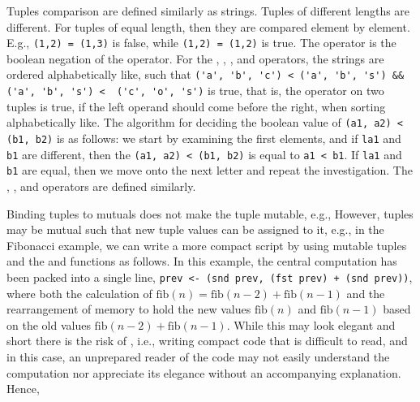 Tuples comparison are defined similarly as strings. Tuples of different lengths are different. For tuples of equal length, then they are compared element by element. E.g., \lstinline!(1,2) = (1,3)! is false, while \lstinline!(1,2) = (1,2)! is true. The \lexeme{<>} operator is the boolean negation of the \lexeme{=} operator. For the \lexeme{<} , \lexeme{<=}, \lexeme{>}, and \lexeme{>=} operators, the strings are ordered alphabetically like, such that \lstinline!('a', 'b', 'c') < ('a', 'b', 's') && ('a', 'b', 's') <  ('c', 'o', 's')! is true, that is, the \lexeme{<} operator on two tuples is true, if the left operand should come before the right, when sorting alphabetically like. 
%
%
The algorithm for deciding the boolean value of \lstinline!(a1, a2) < (b1, b2)! is as follows: we start by examining the first elements, and if \lstinline!la1! and \lstinline!b1! are different, then the \lstinline!(a1, a2) < (b1, b2)! is equal to \lstinline!a1 < b1!. If \lstinline!la1! and \lstinline!b1! are equal, then we move onto the next letter and repeat the investigation. The \lexeme{<=}, \lexeme{>}, and \lexeme{>=} operators are defined similarly.

Binding tuples to mutuals does not make the tuple mutable, e.g.,
%
%
However, tuples may be mutual such that new tuple values can be assigned to it, e.g., in the Fibonacci example, we can write a more compact script by using mutable tuples and the  and  functions as follows.
%
%
In this example, the central computation has been packed into a single line, \lstinline!prev <- (snd prev, (fst prev) + (snd prev))!, where both the calculation of $\text{fib}(n) = \text{fib}(n-2) + \text{fib}(n-1)$ and the rearrangement of memory to hold the new values $\text{fib}(n)$ and $\text{fib}(n-1)$ based on the old values $\text{fib}(n-2) + \text{fib}(n-1)$. While this may look elegant and short there is the risk of , i.e., writing compact code that is difficult to read, and in this case, an unprepared reader of the code may not easily understand the computation nor appreciate its elegance without an accompanying explanation.  Hence, 

